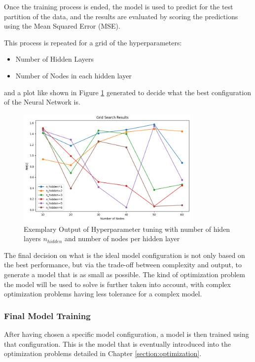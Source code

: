 Once the training process is ended, the model is used to predict for the test partition of the data, and the results are evaluated by scoring the predictions using the Mean Squared Error (MSE). 

This process is repeated for a grid of the hyperparameters:
\begin{itemize}
	\item Number of Hidden Layers
	\item Number of Nodes in each hidden layer
\end{itemize}

and a plot like shown in Figure	\ref{fig:hyperparm} generated to decide what the best configuration of the Neural Network is. 

\begin{figure}[h] 
	\centering
	\includegraphics[width=0.8\textwidth]{figures/modelling/hyperparm.png} 
	\caption{Exemplary Output of Hyperparameter tuning with number of hiden layers $n_{hidden} $ and number of nodes per hidden layer}
	\label{fig:hyperparm}
\end{figure}

The final decision on what is the ideal model configuration is not only based on the best performance, but via the trade-off between complexity and output, to generate a model that is as small as possible. The kind of optimization problem the model will be used to solve is further taken into account, with complex optimization problems having less tolerance for a complex model.


\subsubsection{Final Model Training}

After having chosen a specific model configuration, a model is then trained using that configuration. This is the model that is eventually introduced into the optimization problems detailed in Chapter \ref{section:optimization}.

